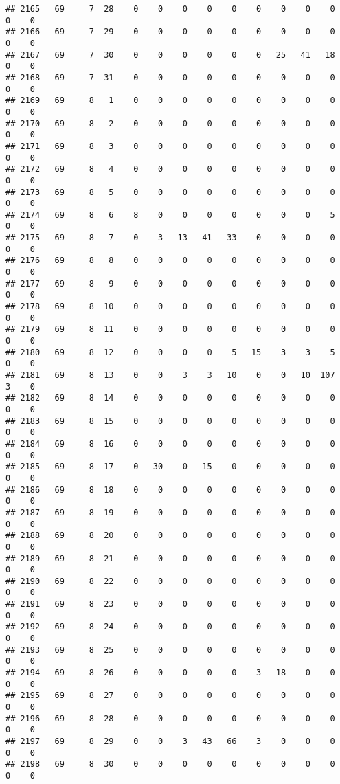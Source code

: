 \documentclass[]{article}
\begin{document}
\begin{verbatim}
## 2165   69     7  28    0    0    0    0    0    0    0    0    0    0    0
## 2166   69     7  29    0    0    0    0    0    0    0    0    0    0    0
## 2167   69     7  30    0    0    0    0    0    0   25   41   18    0    0
## 2168   69     7  31    0    0    0    0    0    0    0    0    0    0    0
## 2169   69     8   1    0    0    0    0    0    0    0    0    0    0    0
## 2170   69     8   2    0    0    0    0    0    0    0    0    0    0    0
## 2171   69     8   3    0    0    0    0    0    0    0    0    0    0    0
## 2172   69     8   4    0    0    0    0    0    0    0    0    0    0    0
## 2173   69     8   5    0    0    0    0    0    0    0    0    0    0    0
## 2174   69     8   6    8    0    0    0    0    0    0    0    5    0    0
## 2175   69     8   7    0    3   13   41   33    0    0    0    0    0    0
## 2176   69     8   8    0    0    0    0    0    0    0    0    0    0    0
## 2177   69     8   9    0    0    0    0    0    0    0    0    0    0    0
## 2178   69     8  10    0    0    0    0    0    0    0    0    0    0    0
## 2179   69     8  11    0    0    0    0    0    0    0    0    0    0    0
## 2180   69     8  12    0    0    0    0    5   15    3    3    5    0    0
## 2181   69     8  13    0    0    3    3   10    0    0   10  107    3    0
## 2182   69     8  14    0    0    0    0    0    0    0    0    0    0    0
## 2183   69     8  15    0    0    0    0    0    0    0    0    0    0    0
## 2184   69     8  16    0    0    0    0    0    0    0    0    0    0    0
## 2185   69     8  17    0   30    0   15    0    0    0    0    0    0    0
## 2186   69     8  18    0    0    0    0    0    0    0    0    0    0    0
## 2187   69     8  19    0    0    0    0    0    0    0    0    0    0    0
## 2188   69     8  20    0    0    0    0    0    0    0    0    0    0    0
## 2189   69     8  21    0    0    0    0    0    0    0    0    0    0    0
## 2190   69     8  22    0    0    0    0    0    0    0    0    0    0    0
## 2191   69     8  23    0    0    0    0    0    0    0    0    0    0    0
## 2192   69     8  24    0    0    0    0    0    0    0    0    0    0    0
## 2193   69     8  25    0    0    0    0    0    0    0    0    0    0    0
## 2194   69     8  26    0    0    0    0    0    3   18    0    0    0    0
## 2195   69     8  27    0    0    0    0    0    0    0    0    0    0    0
## 2196   69     8  28    0    0    0    0    0    0    0    0    0    0    0
## 2197   69     8  29    0    0    3   43   66    3    0    0    0    0    0
## 2198   69     8  30    0    0    0    0    0    0    0    0    0    0    0

\end{verbatim}
\end{document}
